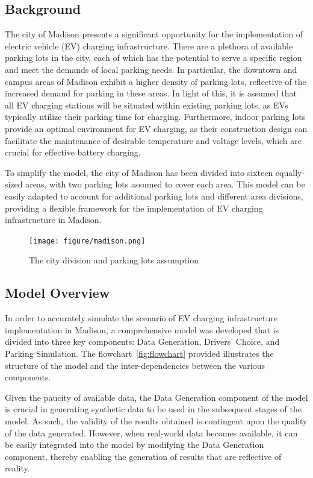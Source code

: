 \subsection{Background}


The city of Madison presents a significant opportunity for the implementation of electric vehicle (EV) charging infrastructure. There are a plethora of available parking lots in the city, each of which has the potential to serve a specific region and meet the demands of local parking needs. In particular, the downtown and campus areas of Madison exhibit a higher density of parking lots, reflective of the increased demand for parking in these areas. In light of this, it is assumed that all EV charging stations will be situated within existing parking lots, as EVs typically utilize their parking time for charging. Furthermore, indoor parking lots provide an optimal environment for EV charging, as their construction design can facilitate the maintenance of desirable temperature and voltage levels, which are crucial for effective battery charging.

To simplify the model, the city of Madison has been divided into sixteen equally-sized areas, with two parking lots assumed to cover each area. This model can be easily adapted to account for additional parking lots and different area divisions, providing a flexible framework for the implementation of EV charging infrastructure in Madison.
\begin{figure}[t]
    \texttt{[image: figure/madison.png]}
    \centering
    \caption{The city division and parking lots assumption}
    \label{fig:madison}
\end{figure}


\subsection{Model Overview}
In order to accurately simulate the scenario of EV charging infrastructure implementation in Madison, a comprehensive model was developed that is divided into three key components: Data Generation, Drivers' Choice, and Parking Simulation. The flowchart~\ref{fig:flowchart} provided illustrates the structure of the model and the inter-dependencies between the various components.

Given the paucity of available data, the Data Generation component of the model is crucial in generating synthetic data to be used in the subsequent stages of the model. As such, the validity of the results obtained is contingent upon the quality of the data generated. However, when real-world data becomes available, it can be easily integrated into the model by modifying the Data Generation component, thereby enabling the generation of results that are reflective of reality.

